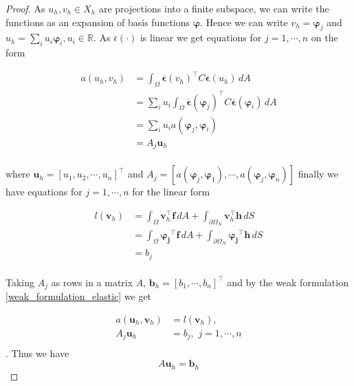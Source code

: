 \documentclass[a4paper,english]{elsarticle}%
\begin{document}
\begin{proof}
    As $ u_h, v_h \in X_h$ are projections into a finite subspace, we can write the functions as an expansion of basis functions $\bm \varphi$. Hence we can write 
    $ v_h = \bm \varphi_j$ and $ u_h = \sum_i u_i \bm \varphi_i, u_i \in \mathbb{R}$. As $\bar \epsilon( \cdot )$ is linear we get equations for $j = 1,\cdots,n$ on the form

    \begin{align*}
        a( u_h, v_h) &= \int_\Omega{ \boldsymbol{\overline \epsilon}( v_h)^\intercal C\boldsymbol{\overline \epsilon}( u_h)} \,dA  \\
        &=\sum_i u_i  \int_\Omega{ \boldsymbol{\overline \epsilon}(\boldsymbol \varphi_j)^\intercal C  \boldsymbol{\overline \epsilon}(\boldsymbol \varphi_i)} \,dA \\
        &= \sum_i u_i a(\bm \varphi_j,\bm \varphi_i) \\
        &= A_j \bm u_h \\
    \end{align*}

    where $\bm u_h = [u_1,u_2,\cdots,u_n]^\intercal$ and $A_j = [a(\bm \varphi_j,\bm \varphi_1),\cdots,a(\bm \varphi_j,\bm \varphi_n)]$ finally we have equations for $j = 1,\cdots,n$ for the linear form

    \begin{align*}
            l(\bm v_h)&= \int_\Omega{\bm v_h^\intercal  \boldsymbol{f}} \,dA + \int_{\partial \Omega_N}{\bm v_h^\intercal \boldsymbol h} \,dS \\
            &= \int_\Omega{\boldsymbol{\varphi_j}^\intercal  \boldsymbol{f}} \,dA + \int_{\partial \Omega_N}{\boldsymbol{\varphi_j}^\intercal \boldsymbol h} \,dS \\
            &= b_j\\
    \end{align*}
    
    Taking $A_j$ as rows in a matrix $A$, $\bm b_h = [b_1,\cdots,b_n]^\intercal$ and by the weak formulation \eqref{weak_formulation_elastic} we get

    \begin{align*}
        a(\bm u_h,\bm v_h) &= l(\bm v_h), \\
        A_j \bm u_h &= b_j, \,\, j = 1,\cdots,n\\
    \end{align*}. 
    Thus we have 
    \begin{equation*}
        A\bm u_h = \bm b_h
    \end{equation*}

\end{proof}
\end{document}
